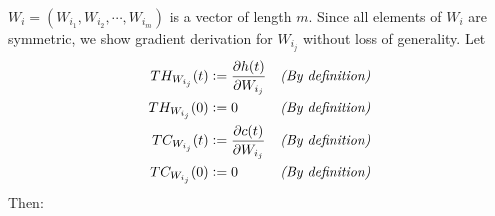 \documentclass{article}
\begin{document}
$W_i = (W_{i_1}, W_{i_2}, \cdots, W_{i_m})$ is a vector of length $m$. Since all elements of $W_i$ are symmetric, we show gradient derivation for $W_{i_j}$ without loss of generality. Let
\begin{align}
TH_{W_{i_j}}(t)  & \vcentcolon = \frac{\partial h(t)}{\partial W_{i_j}}  && \textit{(By definition)} \label{def1} \\
TH_{W_{i_j}}(0)  & \vcentcolon = 0  && \textit{(By definition)} \label{def2} \\
TC_{W_{i_j}}(t)  & \vcentcolon = \frac{\partial c(t)}{\partial W_{i_j}}  && \textit{(By definition)} \label{def3} \\
TC_{W_{i_j}}(0)  & \vcentcolon = 0  && \textit{(By definition)}  \label{def4}
\end{align}
Then:
\end{document}
